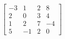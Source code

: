 %
\begin{equation*}
\begin{bmatrix}
-3 & 1 & 2 & 8\\ 
2 & 0 & 3 & 4\\ 
1 & 2 & 7 & -4\\ 
5 & -1 & 2 & 0
\end{bmatrix}
\end{equation*}

